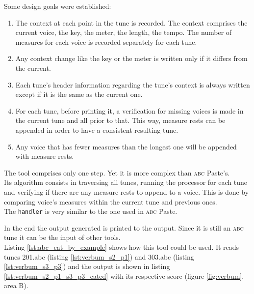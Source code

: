 \documentclass[a4paper,UKenglish]{oasics}
\newcommand{\abc}{\textsc{abc}}
\begin{document}
Some design goals were established:

\begin{enumerate}
  \item The context at each point in the tune is recorded. The context comprises the current voice,
    the key, the meter, the length, the tempo. The number of measures for each voice is recorded
    separately for each tune.
  \item Any context change like the key or the meter is written only if it differs from the current.
  \item Each tune's header information regarding the tune's context is always written except if it
    is the same as the current one.
  \item For each tune, before printing it, a verification for missing voices is made in the current
    tune and all prior to that. This way, measure rests can be appended in order to have a
    consistent resulting tune.
  \item Any voice that has fewer measures than the longest one will be appended with measure rests.
\end{enumerate}

The tool comprises only one step. Yet it is more complex than \abc{} Paste's.\\
Its algorithm consists in traversing all tunes, running the processor for each tune and verifying if
there are any measure rests to append to a voice. This is done by comparing voice's measures within
the current tune and previous ones.\\
The \texttt{handler} is very similar to the one used in \abc{} Paste.

In the end the output generated is printed to the output. Since it is still an \abc{} tune it can be
the input of other tools.\\

Listing \ref{lst:abc_cat_by_example} shows how this tool could be used. It reads tunes 201.abc
(listing \ref{lst:verbum_s2_p1}) and 303.abc (listing \ref{lst:verbum_s3_p3}) and the output is
shown in listing \ref{lst:verbum_s2_p1_s3_p3_cated} with its respective score (figure
\ref{fig:verbum}, area B).




\end{document}
